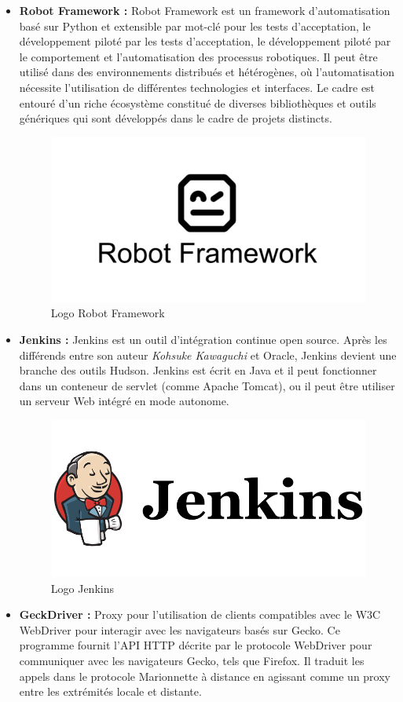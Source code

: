 \begin{itemize}
	\item \textbf{Robot Framework\cite{robotframework} :} Robot Framework est un framework d'automatisation basé sur Python et extensible par mot-clé pour les tests d'acceptation, le développement piloté par les tests d'acceptation, le développement piloté par le comportement et l'automatisation des processus robotiques. Il peut être utilisé dans des environnements distribués et hétérogènes, où l'automatisation nécessite l'utilisation de différentes technologies et interfaces.	Le cadre est entouré d'un riche écosystème constitué de diverses bibliothèques et outils génériques qui sont développés dans le cadre de projets distincts. 
	\begin{figure}[H]
		\centering
		\includegraphics[width=0.4\linewidth]{img/logos/robot-framework}
		\caption[Logo Robot Framework]{Logo Robot Framework}
		\label{fig:robot-framework}
	\end{figure}
	\item \textbf{Jenkins\cite{jenkins} :} Jenkins est un outil d'intégration continue open source. Après les différends entre son auteur \textit{Kohsuke Kawaguchi} et Oracle, Jenkins devient une branche des outils Hudson. Jenkins est écrit en Java et il peut fonctionner dans un conteneur de servlet (comme Apache Tomcat), ou il peut être utiliser un serveur Web intégré en mode autonome.
	\begin{figure}[H]
		\centering
		\includegraphics[width=0.3\linewidth]{img/logos/jenkins}
		\caption[Logo Jenkins]{Logo Jenkins}
		\label{fig:jenkins}
	\end{figure}
	\item \textbf{GeckDriver\cite{geckodrive} :} Proxy pour l'utilisation de clients compatibles avec le W3C WebDriver pour interagir avec les navigateurs basés sur Gecko. Ce programme fournit l'API HTTP décrite par le protocole WebDriver pour communiquer avec les navigateurs Gecko, tels que Firefox. Il traduit les appels dans le protocole Marionnette à distance en agissant comme un proxy entre les extrémités locale et distante. 

\end{itemize}
